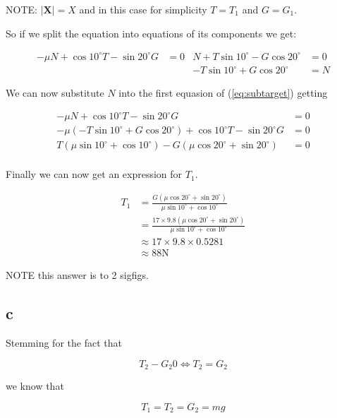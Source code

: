 \documentclass{article}
\begin{document}
NOTE: $\mid\mathbf X\mid = X$ and in this case for simplicity $T=T_1$ and $G = G_1$.

So if we split the equation into equations of its components we get:

\begin{align}
	\label{eq:subtarget}-\mu N + \cos {10^{\circ}} T- \sin {20^{\circ}} G & = 0 & N + T\sin {10^{\circ}} - G\cos {20^{\circ}} & = 0 \\
	                                                                      &     & - T\sin {10^\circ} + G \cos {20^\circ}      & = N
\end{align}

We can now substitute $N$ into the first equasion of (\ref{eq:subtarget}) getting

\begin{align*}
	-\mu N + \cos {10^{\circ}} T- \sin {20^{\circ}} G                                        & = 0 \\
	-\mu (- T\sin {10^\circ} + G \cos {20^\circ}) + \cos {10^{\circ}} T- \sin {20^{\circ}} G & = 0 \\
	T(\mu\sin {10^\circ} + \cos {10^\circ}) -G(\mu \cos {20^\circ} + \sin {20^{\circ}})      & = 0 \\
\end{align*}

Finally we can now get an expression for $T_1$.

\begin{align*}
	T_1 & = \frac {G(\mu \cos {20^\circ} + \sin {20^{\circ}})}{\mu\sin {10^\circ} + \cos {10^\circ}}           \\
	    & = \frac {17\times9.8(\mu \cos {20^\circ} + \sin {20^{\circ}})}{\mu\sin {10^\circ} + \cos {10^\circ}} \\
	    & \approx 17 \times 9.8 \times 0.5281                                                                  \\
	    & \approx 88 \mathrm N
\end{align*}

NOTE this answer is to 2 sigfigs.

\subsection{c}

Stemming for the fact that

$$T_2 - G_2 0 \iff T_2 = G_2$$

we know that

$$T_1 = T_2 = G_2 = mg$$
\end{document}
